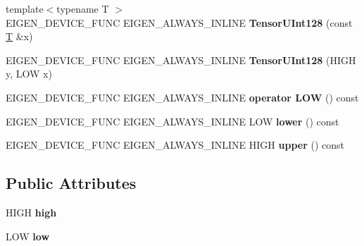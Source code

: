 \begin{DoxyCompactItemize}
\item 
\mbox{\label{struct_eigen_1_1internal_1_1_tensor_u_int128_a87d9fe78634cd96943ef34b785c2bcdc}} 
{\footnotesize template$<$typename T $>$ }\\E\+I\+G\+E\+N\+\_\+\+D\+E\+V\+I\+C\+E\+\_\+\+F\+U\+NC E\+I\+G\+E\+N\+\_\+\+A\+L\+W\+A\+Y\+S\+\_\+\+I\+N\+L\+I\+NE {\bfseries Tensor\+U\+Int128} (const \hyperlink{group___sparse_core___module}{T} \&x)
\item 
\mbox{\label{struct_eigen_1_1internal_1_1_tensor_u_int128_a64b4bf45c13394b02472dcf691022ad0}} 
E\+I\+G\+E\+N\+\_\+\+D\+E\+V\+I\+C\+E\+\_\+\+F\+U\+NC E\+I\+G\+E\+N\+\_\+\+A\+L\+W\+A\+Y\+S\+\_\+\+I\+N\+L\+I\+NE {\bfseries Tensor\+U\+Int128} (H\+I\+GH y, L\+OW x)
\item 
\mbox{\label{struct_eigen_1_1internal_1_1_tensor_u_int128_ad36791afbbba3b99f9802a32f1599503}} 
E\+I\+G\+E\+N\+\_\+\+D\+E\+V\+I\+C\+E\+\_\+\+F\+U\+NC E\+I\+G\+E\+N\+\_\+\+A\+L\+W\+A\+Y\+S\+\_\+\+I\+N\+L\+I\+NE {\bfseries operator L\+OW} () const
\item 
\mbox{\label{struct_eigen_1_1internal_1_1_tensor_u_int128_a9799bd1ec39bca197d7a2011ec8f9bf5}} 
E\+I\+G\+E\+N\+\_\+\+D\+E\+V\+I\+C\+E\+\_\+\+F\+U\+NC E\+I\+G\+E\+N\+\_\+\+A\+L\+W\+A\+Y\+S\+\_\+\+I\+N\+L\+I\+NE L\+OW {\bfseries lower} () const
\item 
\mbox{\label{struct_eigen_1_1internal_1_1_tensor_u_int128_a1b1564dc24f048e95461d983359921a3}} 
E\+I\+G\+E\+N\+\_\+\+D\+E\+V\+I\+C\+E\+\_\+\+F\+U\+NC E\+I\+G\+E\+N\+\_\+\+A\+L\+W\+A\+Y\+S\+\_\+\+I\+N\+L\+I\+NE H\+I\+GH {\bfseries upper} () const
\end{DoxyCompactItemize}
\subsection*{Public Attributes}
\begin{DoxyCompactItemize}
\item 
\mbox{\label{struct_eigen_1_1internal_1_1_tensor_u_int128_a58ffbc79f7350039a742a30476289abd}} 
H\+I\+GH {\bfseries high}
\item 
\mbox{\label{struct_eigen_1_1internal_1_1_tensor_u_int128_a693ab2eb09ebeb63cd44096c4f6b9880}} 
L\+OW {\bfseries low}
\end{DoxyCompactItemize}


